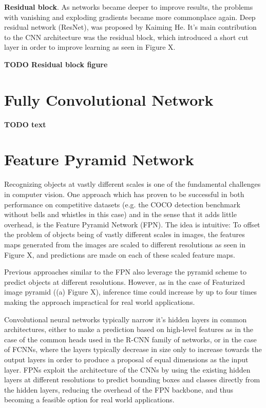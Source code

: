 \documentclass[english, bibtex]{kththesis}
\begin{document}
\textbf{Residual block}. As networks became deeper to improve results, the problems with vanishing and exploding gradients became more commonplace again. Deep residual network (ResNet), was proposed by Kaiming He. It’s main contribution to the CNN architecture was the residual block, which introduced a short cut layer in order to improve learning as seen in Figure X. 

\textbf{TODO Residual block figure}


\section{Fully Convolutional Network}

\textbf{TODO text}

\section{Feature Pyramid Network}

Recognizing objects at vastly different scales is one of the fundamental challenges in computer vision. One approach which has proven to be successful in both performance on competitive datasets (e.g. the COCO detection benchmark without bells and whistles in this case) and in the sense that it adds little overhead, is the Feature Pyramid Network (FPN). The idea is intuitive: To offset the problem of objects being of vastly different scales in images, the features maps generated from the images are scaled to different resolutions as seen in Figure X, and predictions are made on each of these scaled feature maps.

Previous approaches similar to the FPN also leverage the pyramid scheme to predict objects at different resolutions. However, as in the case of Featurized image pyramid ((a) Figure X), inference time could increase by up to four times making the approach impractical for real world applications.

Convolutional neural networks typically narrow it’s hidden layers in common architectures, either to make a prediction based on high-level features as in the case of the common heads used in the R-CNN family of networks, or in the case of FCNNs, where the layers typically decrease in size only to increase towards the output layers in order to produce a proposal of equal dimensions as the input layer. FPNs exploit the architecture of the CNNs by using the existing hidden layers at different resolutions to predict bounding boxes and classes directly from the hidden layers, reducing the overhead of the FPN backbone, and thus becoming a feasible option for real world applications.
\end{document}
